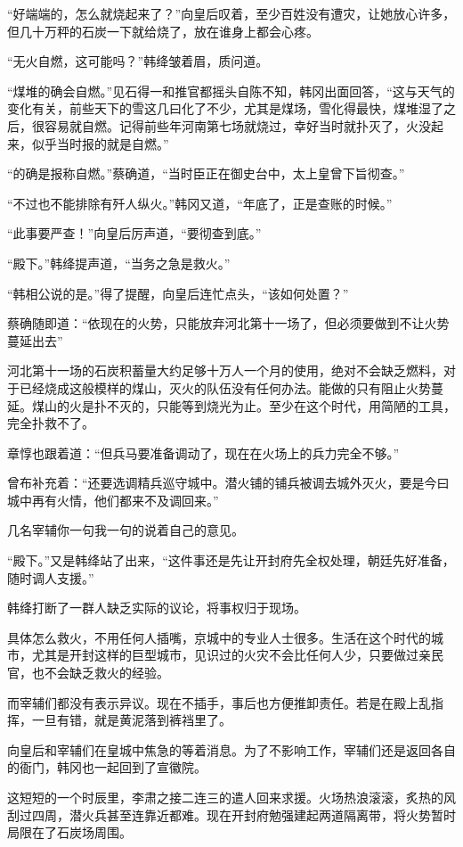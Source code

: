 “好端端的，怎么就烧起来了？”向皇后叹着，至少百姓没有遭灾，让她放心许多，但几十万秤的石炭一下就给烧了，放在谁身上都会心疼。

“无火自燃，这可能吗？”韩绛皱着眉，质问道。

“煤堆的确会自燃。”见石得一和推官都摇头自陈不知，韩冈出面回答，“这与天气的变化有关，前些天下的雪这几曰化了不少，尤其是煤场，雪化得最快，煤堆湿了之后，很容易就自燃。记得前些年河南第七场就烧过，幸好当时就扑灭了，火没起来，似乎当时报的就是自燃。”

“的确是报称自燃。”蔡确道，“当时臣正在御史台中，太上皇曾下旨彻查。”

“不过也不能排除有歼人纵火。”韩冈又道，“年底了，正是查账的时候。”

“此事要严查！”向皇后厉声道，“要彻查到底。”

“殿下。”韩绛提声道，“当务之急是救火。”

“韩相公说的是。”得了提醒，向皇后连忙点头，“该如何处置？”

蔡确随即道：“依现在的火势，只能放弃河北第十一场了，但必须要做到不让火势蔓延出去”

河北第十一场的石炭积蓄量大约足够十万人一个月的使用，绝对不会缺乏燃料，对于已经烧成这般模样的煤山，灭火的队伍没有任何办法。能做的只有阻止火势蔓延。煤山的火是扑不灭的，只能等到烧光为止。至少在这个时代，用简陋的工具，完全扑救不了。

章惇也跟着道：“但兵马要准备调动了，现在在火场上的兵力完全不够。”

曾布补充着：“还要选调精兵巡守城中。潜火铺的铺兵被调去城外灭火，要是今曰城中再有火情，他们都来不及调回来。”

几名宰辅你一句我一句的说着自己的意见。

“殿下。”又是韩绛站了出来，“这件事还是先让开封府先全权处理，朝廷先好准备，随时调人支援。”

韩绛打断了一群人缺乏实际的议论，将事权归于现场。

具体怎么救火，不用任何人插嘴，京城中的专业人士很多。生活在这个时代的城市，尤其是开封这样的巨型城市，见识过的火灾不会比任何人少，只要做过亲民官，也不会缺乏救火的经验。

而宰辅们都没有表示异议。现在不插手，事后也方便推卸责任。若是在殿上乱指挥，一旦有错，就是黄泥落到裤裆里了。

向皇后和宰辅们在皇城中焦急的等着消息。为了不影响工作，宰辅们还是返回各自的衙门，韩冈也一起回到了宣徽院。

这短短的一个时辰里，李肃之接二连三的遣人回来求援。火场热浪滚滚，炙热的风刮过四周，潜火兵甚至连靠近都难。现在开封府勉强建起两道隔离带，将火势暂时局限在了石炭场周围。

